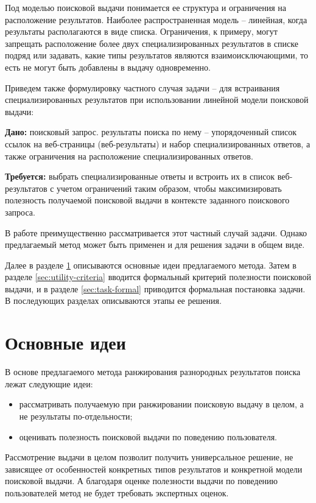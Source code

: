 \documentclass[12pt,a4paper]{report}
\newcommand\note[1]{\textcolor{red}{(#1)}}
\newcommand\todonote[1]{\note{TODO: #1}}
\begin{document}
\noindent Под моделью поисковой выдачи понимается ее структура и ограничения на расположение результатов. Наиболее распространенная модель -- линейная, когда результаты располагаются в виде списка. Ограничения, к примеру, могут запрещать расположение более двух специализированных результатов в списке подряд или задавать, какие типы результатов являются взаимоисключающими, то есть не могут быть добавлены в выдачу одновременно.

Приведем также формулировку частного случая задачи -- для встраивания специализированных результатов при использовании линейной модели поисковой выдачи:

\vspace{3mm}
\textbf{Дано:} поисковый запрос. результаты поиска по нему -- упорядоченный список ссылок на веб-страницы (веб-результаты) и набор специализированных ответов, а также ограничения на расположение специализированных ответов. 

\textbf{Требуется:} выбрать специализированные ответы и встроить их в список веб-результатов с учетом ограничений таким образом, чтобы максимизировать полезность получаемой поисковой выдачи в контексте заданного поискового запроса.
\vspace{3mm}

\noindent В работе преимущественно рассматривается этот частный случай задачи. Однако предлагаемый метод может быть применен и для решения задачи в общем виде.

Далее в разделе \ref{sec:base-ideas} описываются основные идеи предлагаемого метода. Затем в разделе \ref{sec:utility-criteria} вводится формальный критерий полезности поисковой выдачи, и в разделе \ref{sec:task-formal} приводится формальная постановка задачи. В последующих разделах описываются этапы ее решения.


\section{Основные идеи}
\label{sec:base-ideas}

В основе предлагаемого метода ранжирования разнородных результатов поиска лежат следующие идеи:
\begin{itemize}
\item рассматривать получаемую при ранжировании поисковую выдачу в целом, а не результаты по-отдельности;
\item оценивать полезность поисковой выдачи по поведению пользователя. 
\end{itemize}
Рассмотрение выдачи в целом позволит получить универсальное решение, не зависящее от особенностей конкретных типов результатов и конкретной модели поисковой выдачи. А благодаря оценке полезности выдачи по поведению пользователей метод не будет требовать экспертных оценок.
\end{document}
